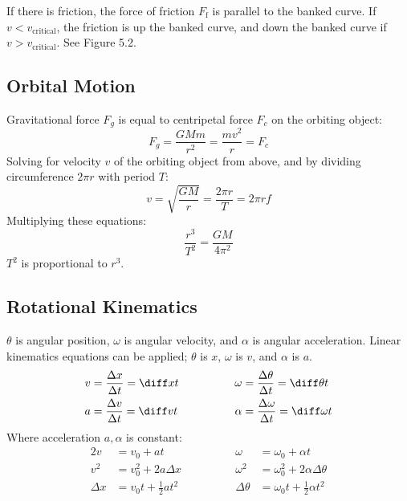 \documentclass{article}
\newcommand{\theorem}[2]{\begin{tcolorbox}[title={#1},colback=blue!5!white,colframe=blue!75!black,parbox=false] #2 \end{tcolorbox}}
\begin{document}
If there is friction, the force of friction $F_ \text{f}$ is parallel to the banked curve. If $v<v_ \text{critical}$, the friction is up the banked curve, and down the banked curve if $v> v_ \text{critical}$. See Figure 5.2.

\subsection{Orbital Motion}

Gravitational force $F_g$ is equal to centripetal force $F_c$ on the orbiting object:
\begin{equation*}
    F_g
	=\frac{GMm}{r^2}
    =\frac{mv^2}{r}
	=F_c
\end{equation*}
Solving for velocity $v$ of the orbiting object from above, and by dividing circumference $2\pi r$ with period $T$:
\begin{equation*}
	v=\sqrt{\frac{GM}{r}}
	=\frac{2\pi r}{T}
	=2\pi r f
\end{equation*}
Multiplying these equations:
\begin{equation*}
    \frac{r^3}{T^2}
	=\frac{GM}{4\pi^2}
\end{equation*}
$T^2$ is proportional to $r^3$.

\theorem{Kepler's third law}{

}

\subsection{Rotational Kinematics}

\theorem{Rotational kinematics basics}{$\theta$ is angular position, $\omega$ is angular velocity, and $\alpha$ is angular acceleration. Linear kinematics equations can be applied; $\theta$ is $x$, $\omega$ is $v$, and $\alpha$ is $a$.
\begin{alignat*}{2}
	v
	&=\frac{\Delta x}{\Delta t}=\diff xt
	&\qquad\qquad
	\omega
	&=\frac{\Delta \theta}{\Delta t}=\diff \theta t \\
	a
	&=\frac{\Delta v}{\Delta t}=\diff vt
	&\qquad\qquad
	\alpha
	&=\frac{\Delta \omega}{\Delta t}=\diff \omega t
\end{alignat*}
Where acceleration $a,\alpha$ is constant:
\begin{alignat*}{2}
	v 
	&=v_0+at
	&\qquad\qquad
	\omega 
	&=\omega_0+\alpha t \\
	v^2
	&=v_0^2+2a\Delta x
	&\qquad\qquad
	\omega^2
	&=\omega_0^2+2\alpha \Delta \theta \\
	\Delta x
	&=v_0t+\frac12at^2
	&\qquad\qquad
	\Delta \theta
	&=\omega_0t +\frac12\alpha t^2
\end{alignat*}
}
\end{document}
